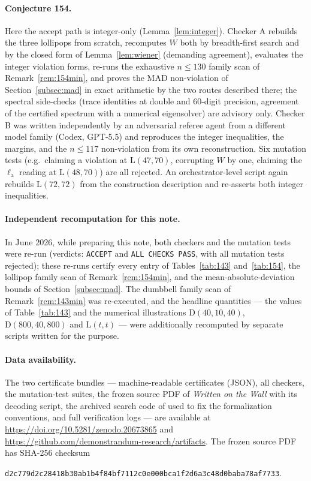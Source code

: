 \documentclass[11pt]{article}
\theoremstyle{remark}
\newcommand{\la}{\ell_{\mathrm{a}}}
\newcommand{\D}{\mathrm{D}}
\newcommand{\Lol}{\mathrm{L}}
\begin{document}
\paragraph{Conjecture 154.}
Here the accept path is integer-only (Lemma~\ref{lem:integer}). Checker A
rebuilds the three lollipops from scratch, recomputes $W$ both by
breadth-first search and by the closed form of Lemma~\ref{lem:wiener}
(demanding agreement), evaluates the integer violation forms, re-runs the
exhaustive $n \le 130$ family scan of Remark~\ref{rem:154min}, and proves the
MAD non-violation of Section~\ref{subsec:mad} in exact arithmetic by the two
routes described there; the spectral side-checks (trace identities at double
and 60-digit precision, agreement of the certified spectrum with a numerical
eigensolver) are advisory only. Checker B was written independently by an
adversarial referee agent from a different model family (Codex, GPT-5.5)
and reproduces the
integer inequalities, the margins, and the $n \le 117$ non-violation from
its own reconstruction. Six mutation tests (e.g.\ claiming a violation at
$\Lol(47,70)$, corrupting $W$ by one, claiming the $\la$ reading at
$\Lol(48,70)$) are all rejected. An orchestrator-level script again rebuilds
$\Lol(72,72)$ from the construction description and re-asserts both integer
inequalities.

\paragraph{Independent recomputation for this note.}
In June 2026, while preparing this note, both checkers and the mutation
tests were re-run (verdicts: \texttt{ACCEPT} and \texttt{ALL CHECKS PASS},
with all mutation tests rejected); these re-runs certify every entry of
Tables~\ref{tab:143} and~\ref{tab:154}, the lollipop family scan of
Remark~\ref{rem:154min}, and the mean-absolute-deviation bounds of
Section~\ref{subsec:mad}. The dumbbell family scan of
Remark~\ref{rem:143min} was re-executed, and the headline quantities --- the
values of Table~\ref{tab:143} and the numerical illustrations
$\D(40,10,40)$, $\D(800,40,800)$ and $\Lol(t,t)$ --- were additionally
recomputed by separate scripts written for the purpose.

\paragraph{Data availability.}
The two certificate bundles --- machine-readable certificates (JSON),
all checkers, the mutation-test suites, the frozen source PDF of
\emph{Written on the Wall} with its decoding script, the archived search code
of \cite{RoucairolCazenave2025} used to fix the formalization conventions,
and full verification logs --- are available at
\url{https://doi.org/10.5281/zenodo.20673865} and
\url{https://github.com/demonstrandum-research/artifacts}. The frozen source PDF has SHA-256 checksum
\begin{center}
\texttt{\small d2c779d2c28418b30ab1b4f84bf7112c0e000bca1f2d6a3c48d0baba78af7733}.
\end{center}
\end{document}
